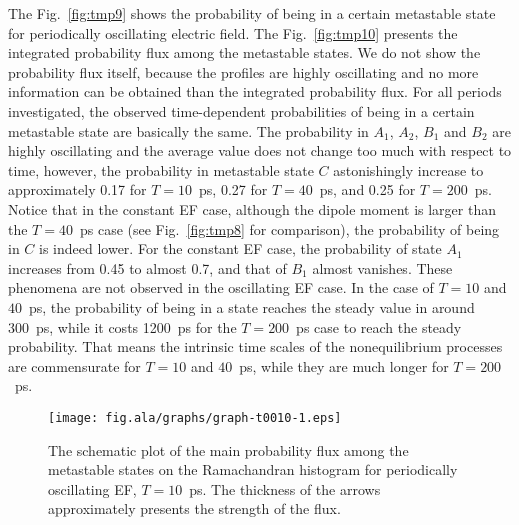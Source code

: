 \documentclass[a4paper,preprint,unsortedaddress,onecolumn]{revtex4-1}
\begin{document}
The Fig.~\ref{fig:tmp9} shows the probability of being in a certain
metastable state for periodically oscillating electric field.  The
Fig.~\ref{fig:tmp10} presents the integrated probability flux among
the metastable states. We do not show the probability flux itself,
because the profiles are highly oscillating and no more
information can be obtained than the integrated probability flux.
For all periods investigated,
the observed time-dependent probabilities of being in a certain metastable
state are basically the same.
The probability in $A_1$, $A_2$, $B_1$ and $B_2$ are
highly oscillating and the average value does not change
too much with respect to time,
however, the probability in metastable state $C$ astonishingly
increase to approximately 0.17 for $T=10$~ps, 0.27 for  $T=40$~ps, and
0.25 for $T=200$~ps.
Notice that in the constant EF case, although the dipole moment is
larger than the  $T=40$~ps case (see Fig.~\ref{fig:tmp8} for comparison), the
probability of being in $C$ is indeed lower.
For the constant EF case, the probability of state $A_1$
increases from 0.45 to almost 0.7, and that of $B_1$ almost vanishes.
These phenomena are not observed in the oscillating EF case.
In the case of $T=10$ and $40$~ps, the probability of being in a state
reaches the steady value in around 300~ps, while it costs 1200~ps
for the $T=200$~ps case to reach the steady probability. That means
the intrinsic time scales of the nonequilibrium processes are commensurate
for $T=10$ and $40$~ps, while they are much longer for $T=200$~ps.

\begin{figure}
  \centering
  \texttt{[image: fig.ala/graphs/graph-t0010-1.eps]}
  \caption{The schematic plot of the main probability flux among the metastable
    states on the Ramachandran histogram
    for periodically oscillating EF, $T=10$~ps. The thickness 
    of the arrows approximately presents the strength of the flux.
  }
  \label{fig:tmp11}
\end{figure}
\end{document}
